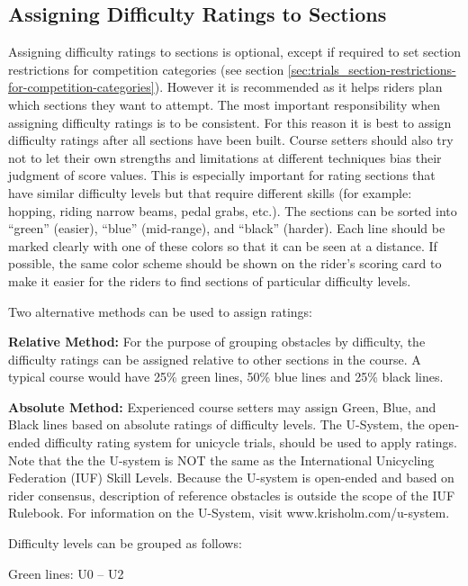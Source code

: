 \subsection{Assigning Difficulty Ratings to Sections \label{subsec:trials_guidelines-for-course-setters_assigning-difficulty-ratings}}
Assigning difficulty ratings to sections is optional, except if required to set section restrictions for competition categories (see section \ref{sec:trials_section-restrictions-for-competition-categories}).
However it is recommended as it helps riders plan which sections they want to attempt. 
The most important responsibility when assigning difficulty ratings is to be consistent.
For this reason it is best to assign difficulty ratings after all sections have been built.
Course setters should also try not to let their own strengths and limitations at different techniques bias their judgment of score values.
This is especially important for rating sections that have similar difficulty levels but that require different skills (for example: hopping, riding narrow beams, pedal grabs, etc.). 
The sections can be sorted into ``green'' (easier), ``blue'' (mid-range), and ``black'' (harder).
Each line should be marked clearly with one of these colors so that it can be seen at a distance.
If possible, the same color scheme should be shown on the rider's scoring card to make it easier for the riders to find sections of particular difficulty levels.

Two alternative methods can be used to assign ratings:

\textbf{Relative Method:}
For the purpose of grouping obstacles by difficulty, the difficulty ratings can be assigned relative to other sections in the course. A typical course would have 25\% green lines, 50\% blue lines and 25\% black lines.

\textbf{Absolute Method:}
Experienced course setters may assign Green, Blue, and Black lines based on absolute ratings of difficulty levels.
The U-System, the open-ended difficulty rating system for unicycle trials, should be used to apply ratings.
Note that the the U-system is NOT the same as the International Unicycling Federation (IUF) Skill Levels.
Because the U-system is open-ended and based on rider consensus, description of reference obstacles is outside the scope of the IUF Rulebook.
For information on the U-System, visit www.krisholm.com/u-system.

Difficulty levels can be grouped as follows:

Green lines: U0 – U2

